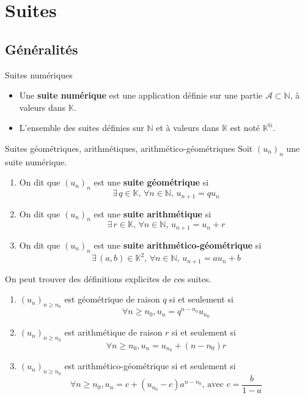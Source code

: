 \chapter{Suites}
\chaptertoc

\section{Généralités}

    \begin{defi}{Suites numériques}{}
        \begin{itemize}
            \item Une \textbf{suite numérique} est une application définie sur une partie $\mathcal{A} \subset \mathbb{N}$, à valeurs dans $\mathbb{K}$.
            \item L’ensemble des suites définies sur $\mathbb{N}$ et à valeurs dans $\mathbb{K}$ est noté $\mathbb{K}^{\mathbb{N}}$.
        \end{itemize}
    \end{defi}

    \begin{prop}{Suites géométriques, arithmétiques, arithmético-géométriques}{}
        Soit $(u_n)_n$ une suite numérique.
        \begin{enumerate}
            \item On dit que $(u_n)_n$ est une \textbf{suite géométrique} si 
            \[ \exists \, q \in \mathbb{K}, \, \forall n \in \mathbb{N}, \, u_{n+1} = qu_n \]
            \item On dit que $(u_n)_n$ est une \textbf{suite arithmétique} si 
            \[ \exists \, r \in \mathbb{K}, \, \forall n \in \mathbb{N}, \, u_{n+1} = u_n + r \]
            \item On dit que $(u_n)_n$ est une \textbf{suite arithmético-géométrique} si 
            \[ \exists \, (a,b) \in \mathbb{K}^2, \, \forall n \in \mathbb{N}, \, u_{n+1} = au_n + b \]
        \end{enumerate}
        On peut trouver des définitions explicites de ces suites.
        \begin{enumerate}
            \item $(u_n)_{n \geq n_0}$ est géométrique de raison $q$ si et seulement si \[ \forall n \geq n_0, u_n = q^{n-n_0} u_{n_0} \]
            \item $(u_n)_{n \geq n_0}$ est arithmétique de raison $r$ si et seulement si \[ \forall n \geq n_0, u_n = u_{n_0} + (n - n_0)r \]
            \item $(u_n)_{n \geq n_0}$ est arithmético-géométrique si et seulement si \[\forall n \geq n_0, u_n = c + (u_{n_0} - c)a^{n-n_0} \text{, avec } c = \frac{b}{1-a} \]
        \end{enumerate}
    \end{prop}

